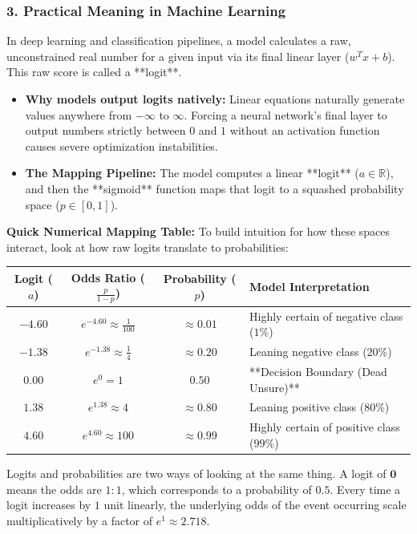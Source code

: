 \documentclass{article}
\begin{document}
\subsubsection*{3. Practical Meaning in Machine Learning}
In deep learning and classification pipelines, a model calculates a raw, unconstrained real number for a given input via its final linear layer ($w^T x + b$). This raw score is called a **logit**. 

\begin{itemize}
    \item \textbf{Why models output logits natively:} Linear equations naturally generate values anywhere from $-\infty$ to $\infty$. Forcing a neural network's final layer to output numbers strictly between $0$ and $1$ without an activation function causes severe optimization instabilities.
    \item \textbf{The Mapping Pipeline:} The model computes a linear **logit** ($a \in \mathbb{R}$), and then the **sigmoid** function maps that logit to a squashed probability space ($p \in [0, 1]$).
\end{itemize}

\vspace{0.2cm}
\noindent \textbf{Quick Numerical Mapping Table:}
To build intuition for how these spaces interact, look at how raw logits translate to probabilities:
\begin{center}
\begin{tabular}{|c|c|c|l|}
\hline
\textbf{Logit ($a$)} & \textbf{Odds Ratio ($\frac{p}{1-p}$)} & \textbf{Probability ($p$)} & \textbf{Model Interpretation} \\ \hline
$-4.60$ & $e^{-4.60} \approx \frac{1}{100}$ & $\approx 0.01$ & Highly certain of negative class ($1\%$) \\ \hline
$-1.38$ & $e^{-1.38} \approx \frac{1}{4}$ & $\approx 0.20$ & Leaning negative class ($20\%$) \\ \hline
$\mathbf{0.00}$ & $e^{0} = 1$ & $\mathbf{0.50}$ & **Decision Boundary (Dead Unsure)** \\ \hline
$1.38$ & $e^{1.38} \approx 4$ & $\approx 0.80$ & Leaning positive class ($80\%$) \\ \hline
$4.60$ & $e^{4.60} \approx 100$ & $\approx 0.99$ & Highly certain of positive class ($99\%$) \\ \hline
\end{tabular}
\end{center}

\begin{tcolorbox}[colback=blue!5!white, colframe=blue!60!black, title=Core Structural Takeaway]
Logits and probabilities are two ways of looking at the same thing. A logit of $\mathbf{0}$ means the odds are $1:1$, which corresponds to a probability of $\mathbf{0.5}$. Every time a logit increases by $1$ unit linearly, the underlying odds of the event occurring scale multiplicatively by a factor of $e^1 \approx 2.718$.
\end{tcolorbox}
\end{document}
